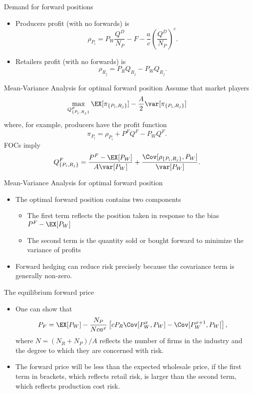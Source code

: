 {Demand for forward positions}
\begin{itemize}
\item<1-> Producers profit (with no forwards) is
$$
\rho_{P_i}=P_W\frac{Q^D}{N_P}-F-\frac{a}{c}\left(\frac{Q^D}{N_P}\right)^{c}.$$
\item<2-> Retailers profit (with no forwards) is
$$
\rho_{R_j}=P_RQ_{R_j}-P_WQ_{R_j}.
$$
\end{itemize}

{Mean-Variance Analysis for optimal forward position}
Assume that market players
$$
\max_{Q^F_{\{P_i,R_j\}}}\EX[\pi_{\{P_i,R_j\}}]-\frac{A}{2}\var[\pi_{\{P_i,R_j\}}]
$$
where, for example, producers have the profit function
$$
\pi_{P_i}=\rho_{P_i}+ P^FQ^F-P_WQ^F.
$$
FOCs imply
$$
Q^F_{\{P_i,R_j\}}= \frac{P^F-\EX[P_W]}{A\var[P_W]}+\frac{\Cov[\rho_{\{P_i,R_j\}},P_W]}{\var[P_W]}.
$$

{Mean-Variance Analysis for optimal forward position}
\begin{itemize}
\item<1-> The optimal forward position contains two components
\begin{itemize}
\item The first term reflects the position taken in response to the bias $P^F-\EX[P_W]$
\item The second term is the quantity sold or bought forward to minimize the variance of profits
\end{itemize}
\item<2-> Forward hedging can reduce risk precisely because the covariance term is generally non-zero.
\end{itemize}

{The equilibrium forward price}
\begin{itemize}
\item<1-> One can show that
$$
P_F=\EX[P_W]-\frac{N_P}{Nca^x}\left[cP_R\Cov[P_W^{x}, P_W]-\Cov[P_W^{x+1}, P_W]\right],
$$
where $N=(N_R+N_P)/A$ reflects the number of firms in the industry and the degree to which they are concerned with risk.
\item<2-> The forward price will be less than the expected wholesale price, if the first term in brackets, which reflects retail risk, is
larger than the second term, which reflects production cost risk.
\end{itemize}


